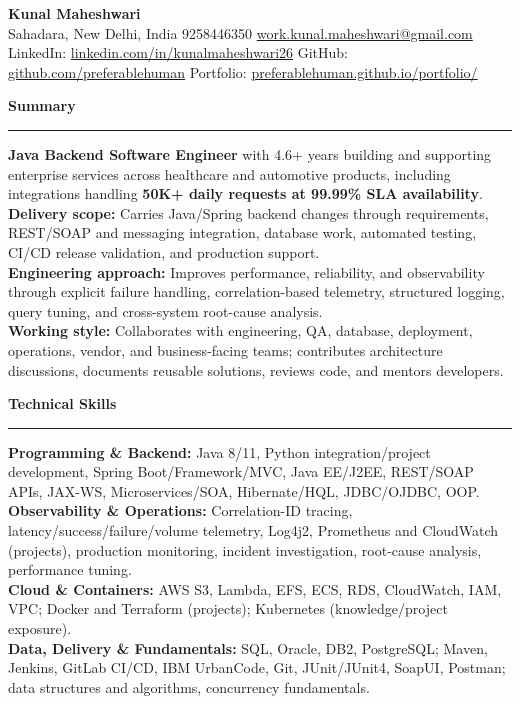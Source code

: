 \documentclass[11pt,letterpaper]{article}
\newcommand{\ressection}[1]{\Needspace{6\baselineskip}\vspace{8pt}\par\textbf{#1}\par\vspace{2pt}\hrule\vspace{5pt}}
\begin{document}
\pagestyle{empty}\raggedright\fontsize{11}{12.5}\selectfont

{\Large \textbf{Kunal Maheshwari}}\\
Sahadara, New Delhi, India \textbar{} 9258446350 \textbar{} \href{mailto:work.kunal.maheshwari@gmail.com}{work.kunal.maheshwari@gmail.com}\\
LinkedIn: \href{https://www.linkedin.com/in/kunalmaheshwari26}{linkedin.com/in/kunalmaheshwari26} \textbar{} GitHub: \href{https://github.com/preferablehuman}{github.com/preferablehuman} \textbar{} Portfolio: \href{https://preferablehuman.github.io/portfolio/}{preferablehuman.github.io/portfolio/}

\ressection{Summary}
\textbf{Java Backend Software Engineer} with 4.6+ years building and supporting enterprise services across healthcare and automotive products, including integrations handling \textbf{50K+ daily requests at 99.99\% SLA availability}.\\[2pt]
\textbf{Delivery scope:} Carries Java/Spring backend changes through requirements, REST/SOAP and messaging integration, database work, automated testing, CI/CD release validation, and production support.\\[2pt]
\textbf{Engineering approach:} Improves performance, reliability, and observability through explicit failure handling, correlation-based telemetry, structured logging, query tuning, and cross-system root-cause analysis.\\[2pt]
\textbf{Working style:} Collaborates with engineering, QA, database, deployment, operations, vendor, and business-facing teams; contributes architecture discussions, documents reusable solutions, reviews code, and mentors developers.

\ressection{Technical Skills}
\textbf{Programming \& Backend:} Java 8/11, Python integration/project development, Spring Boot/Framework/MVC, Java EE/J2EE, REST/SOAP APIs, JAX-WS, Microservices/SOA, Hibernate/HQL, JDBC/OJDBC, OOP.\\
\textbf{Observability \& Operations:} Correlation-ID tracing, latency/success/failure/volume telemetry, Log4j2, Prometheus and CloudWatch (projects), production monitoring, incident investigation, root-cause analysis, performance tuning.\\
\textbf{Cloud \& Containers:} AWS S3, Lambda, EFS, ECS, RDS, CloudWatch, IAM, VPC; Docker and Terraform (projects); Kubernetes (knowledge/project exposure).\\
\textbf{Data, Delivery \& Fundamentals:} SQL, Oracle, DB2, PostgreSQL; Maven, Jenkins, GitLab CI/CD, IBM UrbanCode, Git, JUnit/JUnit4, SoapUI, Postman; data structures and algorithms, concurrency fundamentals.
\end{document}
